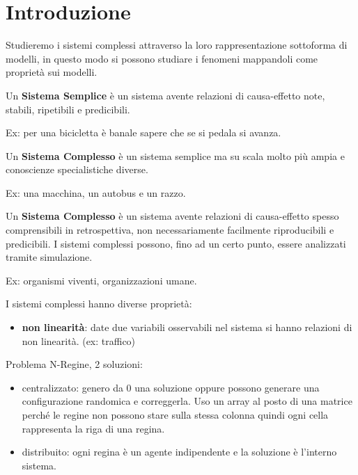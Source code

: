 \chapter{Introduzione}
Studieremo i sistemi complessi attraverso la loro rappresentazione sottoforma di
modelli, in questo modo si possono studiare i fenomeni mappandoli come proprietà
sui modelli.

\begin{definizione} 
    Un \textbf{Sistema Semplice} è un sistema avente relazioni di causa-effetto
    note, stabili, ripetibili e predicibili.
\end{definizione}

\begin{esempio}
    Ex: per una bicicletta è banale sapere che se si pedala si avanza.
\end{esempio}

\begin{definizione} 
    Un \textbf{Sistema Complesso} è un sistema semplice ma su scala molto più ampia
    e conoscienze specialistiche diverse.
\end{definizione}

\begin{esempio}
    Ex: una macchina, un autobus e un razzo.
\end{esempio}

\begin{definizione} 
    Un \textbf{Sistema Complesso} è un sistema avente relazioni di causa-effetto
    spesso comprensibili in retrospettiva, non necessariamente facilmente 
    riproducibili e predicibili. I sistemi complessi possono, fino ad un certo punto,
    essere analizzati tramite simulazione. 
\end{definizione}

\begin{esempio}
    Ex: organismi viventi, organizzazioni umane.    
\end{esempio}

I sistemi complessi hanno diverse proprietà:
\begin{itemize}
    \item \textbf{non linearità}: date due variabili osservabili nel sistema 
    si hanno relazioni di non linearità. (ex: traffico)
\end{itemize}

Problema N-Regine, 2 soluzioni:
\begin{itemize}
    \item centralizzato: genero da 0 una soluzione oppure possono generare una 
    configurazione randomica e correggerla. Uso un array al posto di una matrice 
    perché le regine non possono stare sulla stessa colonna quindi ogni cella 
    rappresenta la riga di una regina.
    \item distribuito: ogni regina è un agente indipendente e la soluzione è l'interno
    sistema.
\end{itemize}

